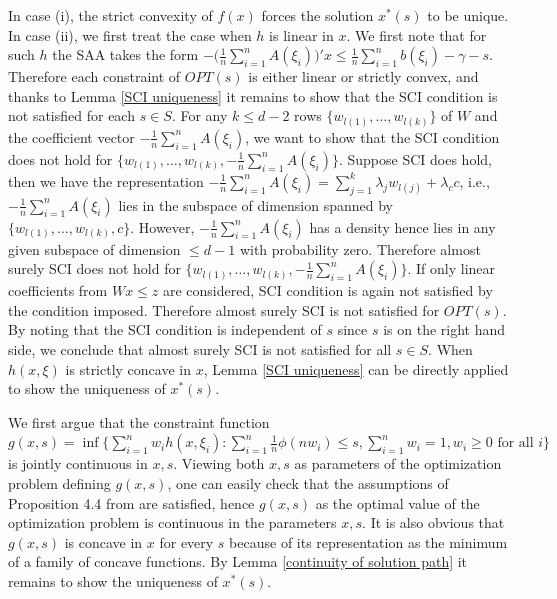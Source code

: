\documentclass[mnsc,blindrev]{informs4} %
\begin{document}
In case (i), the strict convexity of $f(x)$ forces the solution $x^*(s)$ to be unique. In case (ii), we first treat the case when $h$ is linear in $x$. We first note that for such $h$ the SAA takes the form $-\big(\frac{1}{n}\sum_{i=1}^nA(\xi_i)\big)'x\leq \frac{1}{n}\sum_{i=1}^nb(\xi_i)-\gamma-s$. Therefore each constraint of $OPT(s)$ is either linear or strictly convex, and thanks to Lemma \ref{SCI uniqueness} it remains to show that the SCI condition is not satisfied for each $s\in S$. For any $k\leq d-2$ rows $\{w_{l(1)},\ldots,w_{l(k)}\}$ of $W$ and the coefficient vector $-\frac{1}{n}\sum_{i=1}^nA(\xi_i)$, we want to show that the SCI condition does not hold for $\{w_{l(1)},\ldots,w_{l(k)},-\frac{1}{n}\sum_{i=1}^nA(\xi_i)\}$. Suppose SCI does hold, then we have the representation $-\frac{1}{n}\sum_{i=1}^nA(\xi_i) = \sum_{j=1}^k\lambda_j w_{l(j)}+\lambda_cc$, i.e., $-\frac{1}{n}\sum_{i=1}^nA(\xi_i)$ lies in the subspace of dimension spanned by $\{w_{l(1)},\ldots,w_{l(k)},c\}$. However, $-\frac{1}{n}\sum_{i=1}^nA(\xi_i)$ has a density hence lies in any given subspace of dimension $\leq d-1$ with probability zero. Therefore almost surely SCI does not hold for $\{w_{l(1)},\ldots,w_{l(k)},-\frac{1}{n}\sum_{i=1}^nA(\xi_i)\}$. If only linear coefficients from $Wx\leq z$ are considered, SCI condition is again not satisfied by the condition imposed. Therefore almost surely SCI is not satisfied for $OPT(s)$. By noting that the SCI condition is independent of $s$ since $s$ is on the right hand side, we conclude that almost surely SCI is not satisfied for all $s\in S$. When $h(x,\xi)$ is strictly concave in $x$, Lemma \ref{SCI uniqueness} can be directly applied to show the uniqueness of $x^*(s)$.\hfill\Halmos


We first argue that the constraint function $g(x,s)=\inf\Big\{\sum_{i=1}^nw_ih(x,\xi_i):\sum_{i=1}^n\frac{1}{n}\phi(nw_i)\leq s,\sum_{i=1}^nw_i=1,w_i\geq 0\text{ for all } i\Big\}$ is jointly continuous in $x,s$. Viewing both $x,s$ as parameters of the optimization problem defining $g(x,s)$, one can easily check that the assumptions of Proposition 4.4 from \cite{bonnans2013perturbation} are satisfied, hence $g(x,s)$ as the optimal value of the optimization problem is continuous in the parameters $x,s$. It is also obvious that $g(x,s)$ is concave in $x$ for every $s$ because of its representation as the minimum of a family of concave functions. By Lemma \ref{continuity of solution path} it remains to show the uniqueness of $x^*(s)$.
\end{document}
